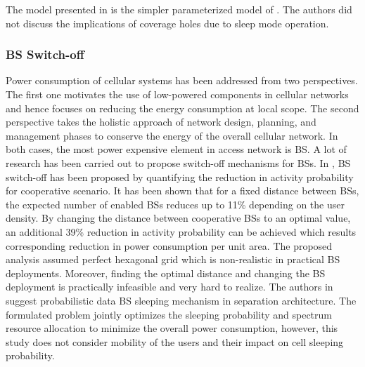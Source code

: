 \documentclass[article,10pt,twocolumn]{IEEEtran}
\begin{document}
The model presented in \citep{6600717} is the simpler parameterized model of \citep{6056691}. The authors did not discuss the implications of coverage holes due to sleep mode operation. 
\subsubsection{BS Switch-off}\label{sec:BS_sw_off}
Power consumption of cellular systems has been addressed from two perspectives. The first one motivates the use of low-powered components in cellular networks and hence focuses on reducing the energy consumption at local scope. The second perspective takes the holistic approach of network design, planning, and management phases to conserve the energy of the overall cellular network. In both cases, the most power expensive element in access network is BS. A lot of research has been carried out to propose switch-off mechanisms for BSs. In \citep{6629715}, BS switch-off has been proposed by quantifying the reduction in activity probability for cooperative scenario. It has been shown that for a fixed distance between BSs, the expected number of enabled BSs reduces up to 11\% depending on the user density. By changing the distance  between cooperative BSs to an optimal value, an additional 39\% reduction in activity probability can be achieved which results corresponding reduction in power consumption per unit area. The proposed analysis assumed perfect hexagonal grid which is non-realistic in practical BS deployments. Moreover, finding the optimal distance and changing the BS deployment is practically infeasible and very hard to realize. The authors in \citep{7037473} suggest probabilistic data BS sleeping mechanism in separation architecture. The formulated problem jointly optimizes the sleeping probability and spectrum resource allocation to minimize the overall power consumption, however, this study does not consider mobility of the users and their impact on cell sleeping probability.
\end{document}
